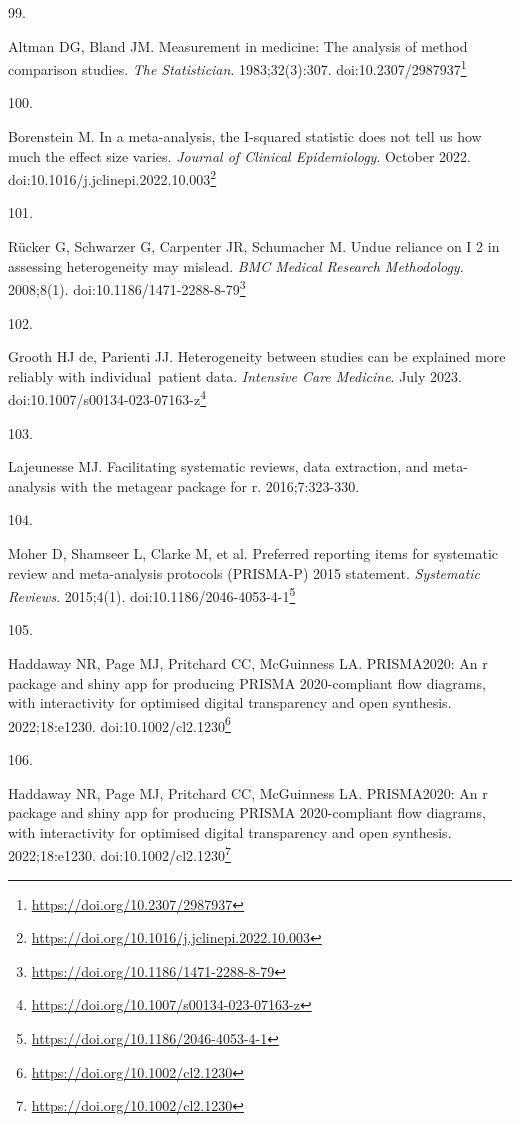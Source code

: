 \documentclass[
]{book}
\newlength{\cslhangindent}
\newlength{\csllabelwidth}
\newlength{\cslentryspacingunit} %
\newenvironment{CSLReferences}[2] %
 {%
  \setlength{\parindent}{0pt}
  \ifodd #1
  \let\oldpar\par
  \def\par{\hangindent=\cslhangindent\oldpar}
  \fi
  \setlength{\parskip}{#2\cslentryspacingunit}
 }%
 {}
\newcommand{\CSLLeftMargin}[1]{\parbox[t]{\csllabelwidth}{#1}}
\newcommand{\CSLRightInline}[1]{\parbox[t]{\linewidth - \csllabelwidth}{#1}\break}
\renewcommand{\href}[2]{#2\footnote{\url{#1}}}
\begin{document}
\begin{CSLReferences}{0}{0}
\leavevmode{}%
\CSLLeftMargin{99. }%
\CSLRightInline{Altman DG, Bland JM. Measurement in medicine: The analysis of method comparison studies. \emph{The Statistician}. 1983;32(3):307. doi:\href{https://doi.org/10.2307/2987937}{10.2307/2987937}}

\leavevmode{}%
\CSLLeftMargin{100. }%
\CSLRightInline{Borenstein M. In a meta-analysis, the I-squared statistic does not tell us how much the effect size varies. \emph{Journal of Clinical Epidemiology}. October 2022. doi:\href{https://doi.org/10.1016/j.jclinepi.2022.10.003}{10.1016/j.jclinepi.2022.10.003}}

\leavevmode{}%
\CSLLeftMargin{101. }%
\CSLRightInline{Rücker G, Schwarzer G, Carpenter JR, Schumacher M. Undue reliance on I 2 in assessing heterogeneity may mislead. \emph{BMC Medical Research Methodology}. 2008;8(1). doi:\href{https://doi.org/10.1186/1471-2288-8-79}{10.1186/1471-2288-8-79}}

\leavevmode{}%
\CSLLeftMargin{102. }%
\CSLRightInline{Grooth HJ de, Parienti JJ. Heterogeneity between studies can be explained more reliably with individual~patient data. \emph{Intensive Care Medicine}. July 2023. doi:\href{https://doi.org/10.1007/s00134-023-07163-z}{10.1007/s00134-023-07163-z}}

\leavevmode{}%
\CSLLeftMargin{103. }%
\CSLRightInline{Lajeunesse MJ. Facilitating systematic reviews, data extraction, and meta-analysis with the metagear package for r. 2016;7:323-330.}

\leavevmode{}%
\CSLLeftMargin{104. }%
\CSLRightInline{Moher D, Shamseer L, Clarke M, et al. Preferred reporting items for systematic review and meta-analysis protocols (PRISMA-P) 2015 statement. \emph{Systematic Reviews}. 2015;4(1). doi:\href{https://doi.org/10.1186/2046-4053-4-1}{10.1186/2046-4053-4-1}}

\leavevmode{}%
\CSLLeftMargin{105. }%
\CSLRightInline{Haddaway NR, Page MJ, Pritchard CC, McGuinness LA. PRISMA2020: An r package and shiny app for producing PRISMA 2020-compliant flow diagrams, with interactivity for optimised digital transparency and open synthesis. 2022;18:e1230. doi:\href{https://doi.org/10.1002/cl2.1230}{10.1002/cl2.1230}}

\leavevmode{}%
\CSLLeftMargin{106. }%
\CSLRightInline{Haddaway NR, Page MJ, Pritchard CC, McGuinness LA. PRISMA2020: An r package and shiny app for producing PRISMA 2020-compliant flow diagrams, with interactivity for optimised digital transparency and open synthesis. 2022;18:e1230. doi:\href{https://doi.org/10.1002/cl2.1230}{10.1002/cl2.1230}}


\end{CSLReferences}
\end{document}
